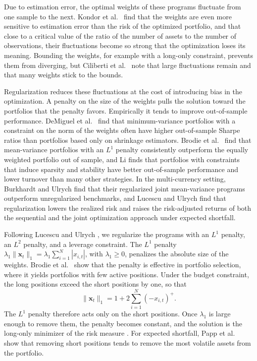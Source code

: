 Due to estimation error, the optimal weights of these programs fluctuate from one sample to the next. Kondor
et al.~\cite{kondor2007noise} find that the weights are even more sensitive to estimation error than the risk of the
optimized portfolio, and that close to a critical value of the ratio of the number of assets to the number of
observations, their fluctuations become so strong that the optimization loses its meaning. Bounding the weights, for
example with a long-only constraint, prevents them from diverging, but Ciliberti et
al.~\cite{ciliberti2007feasibility} note that large fluctuations remain and that many weights stick to the bounds.

Regularization reduces these fluctuations at the cost of introducing bias in the optimization. A penalty on the size of the weights pulls the solution
toward the portfolios that the penalty favors.
Empirically it tends to improve out-of-sample performance. DeMiguel et
al.~\cite{DeMiguelGarlappiNogalesUppal2009} find that minimum-variance portfolios with a constraint on the norm of the
weights often have higher out-of-sample Sharpe ratios than portfolios based only on shrinkage estimators. 
Brodie et al.~\cite{BrodieDaubechiesDeMolGiannoneLoris2009} find that mean-variance
portfolios with an $L^1$ penalty consistently outperform the equally weighted portfolio out of sample, and Li
\cite{Li2015} finds that portfolios with constraints that induce sparsity and stability have better
out-of-sample performance and lower turnover than many other strategies. In the multi-currency setting, Burkhardt and
Ulrych \cite{SparseAndStableInternationalPortfolioOptimization} find that their regularized joint mean-variance programs
outperform unregularized benchmarks, and Lucescu and Ulrych \cite{RegularizedMultiCurrencyExpectedShortfallPortfolios}
find that regularization lowers the realized risk and raises the risk-adjusted returns of both the sequential and the
joint optimization approach under expected shortfall.

Following Lucescu and Ulrych \cite{RegularizedMultiCurrencyExpectedShortfallPortfolios}, we regularize the programs with
an $L^1$ penalty, an $L^2$ penalty, and a leverage constraint. The $L^1$ penalty
$\lambda_1 \|\bm{x}_t\|_1 = \lambda_1 \sum_{i=1}^N |x_{i,t}|$, with $\lambda_1 \ge 0$, penalizes the absolute size of the
weights. Brodie et al.~\cite{BrodieDaubechiesDeMolGiannoneLoris2009}
show that the penalty is effective in portfolio selection, where it yields portfolios with few active positions.
Under the budget constraint, the long positions exceed the short positions by one, so that
\begin{equation*}
    \|\bm{x}_t\|_1 = 1 + 2 \sum_{i=1}^N (-x_{i,t})^+.
\end{equation*}
The $L^1$ penalty therefore acts only on the short positions. Once $\lambda_1$ is large enough to remove them, the
penalty becomes constant, and the solution is the long-only minimizer of the risk measure
\cite{BrodieDaubechiesDeMolGiannoneLoris2009}. For expected shortfall, Papp et al.~\cite{PappKondorCaccioli2021} show
that removing short positions tends to remove the most volatile assets from the portfolio.

